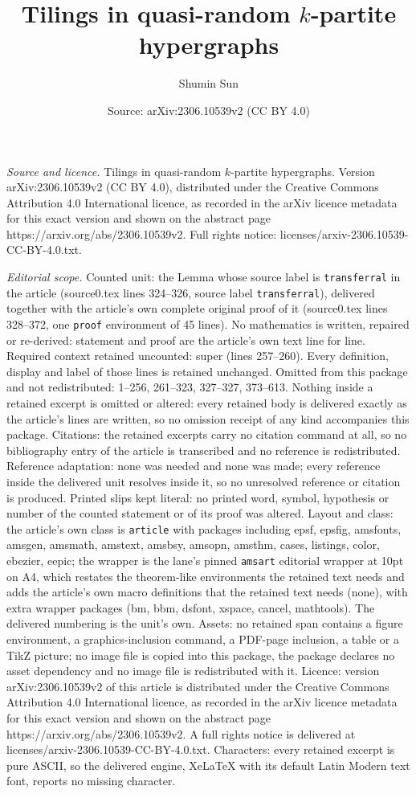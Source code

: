 \documentclass[10pt,a4paper]{amsart}
\title[Tilings in quasi-random $k$-partite hypergraphs]{Tilings in quasi-random $k$-partite hypergraphs}
\author{Shumin Sun}
\date{Source: arXiv:2306.10539v2 (CC BY 4.0)}
\begin{document}
\maketitle

\noindent\emph{Source and licence.} Tilings in quasi-random $k$-partite hypergraphs. Version arXiv:2306.10539v2 (CC BY 4.0), distributed under the Creative Commons Attribution 4.0 International licence, as recorded in the arXiv licence metadata for this exact version and shown on the abstract page https://arxiv.org/abs/2306.10539v2. Full rights notice: licenses/arxiv-2306.10539-CC-BY-4.0.txt.\par\smallskip

\noindent\textit{Editorial scope.} Counted unit: the Lemma whose source label is \texttt{transferral} in the article (source0.tex lines 324--326, source label \texttt{transferral}), delivered together with the article's own complete original proof of it (source0.tex lines 328--372, one \texttt{proof} environment of 45 lines). No mathematics is written, repaired or re-derived: statement and proof are the article's own text line for line. Required context retained uncounted: super (lines 257--260). Every definition, display and label of those lines is retained unchanged. Omitted from this package and not redistributed: 1--256, 261--323, 327--327, 373--613. Nothing inside a retained excerpt is omitted or altered: every retained body is delivered exactly as the article's lines are written, so no omission receipt of any kind accompanies this package. Citations: the retained excerpts carry no citation command at all, so no bibliography entry of the article is transcribed and no reference is redistributed. Reference adaptation: none was needed and none was made; every reference inside the delivered unit resolves inside it, so no unresolved reference or citation is produced. Printed slips kept literal: no printed word, symbol, hypothesis or number of the counted statement or of its proof was altered. Layout and class: the article's own class is \texttt{article} with packages including epsf, epsfig, amsfonts, amsgen, amsmath, amstext, amsbsy, amsopn, amsthm, cases, listings, color, ebezier, eepic; the wrapper is the lane's pinned \texttt{amsart} editorial wrapper at 10pt on A4, which restates the theorem-like environments the retained text needs and adds the article's own macro definitions that the retained text needs (none), with extra wrapper packages (bm, bbm, dsfont, xspace, cancel, mathtools). The delivered numbering is the unit's own. Assets: no retained span contains a figure environment, a graphics-inclusion command, a PDF-page inclusion, a table or a TikZ picture; no image file is copied into this package, the package declares no asset dependency and no image file is redistributed with it. Licence: version arXiv:2306.10539v2 of this article is distributed under the Creative Commons Attribution 4.0 International licence, as recorded in the arXiv licence metadata for this exact version and shown on the abstract page https://arxiv.org/abs/2306.10539v2. A full rights notice is delivered at licenses/arxiv-2306.10539-CC-BY-4.0.txt. Characters: every retained excerpt is pure ASCII, so the delivered engine, XeLaTeX with its default Latin Modern text font, reports no missing character.
\end{document}
